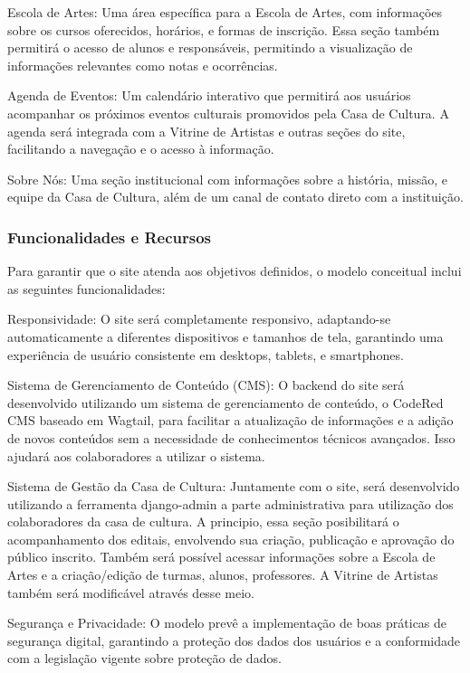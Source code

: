 Escola de Artes: Uma área específica para a Escola de Artes, com informações sobre os cursos oferecidos, horários, e formas de inscrição. Essa seção também permitirá o acesso de alunos e responsáveis, permitindo a visualização de informações relevantes como notas e ocorrências.

Agenda de Eventos: Um calendário interativo que permitirá aos usuários acompanhar os próximos eventos culturais promovidos pela Casa de Cultura. A agenda será integrada com a Vitrine de Artistas e outras seções do site, facilitando a navegação e o acesso à informação.

Sobre Nós: Uma seção institucional com informações sobre a história, missão, e equipe da Casa de Cultura, além de um canal de contato direto com a instituição.

\subsubsection{Funcionalidades e Recursos}

Para garantir que o site atenda aos objetivos definidos, o modelo conceitual inclui as seguintes funcionalidades:

Responsividade: O site será completamente responsivo, adaptando-se automaticamente a diferentes dispositivos e tamanhos de tela, garantindo uma experiência de usuário consistente em desktops, tablets, e smartphones.

Sistema de Gerenciamento de Conteúdo (CMS): O backend do site será desenvolvido utilizando um sistema de gerenciamento de conteúdo, o CodeRed CMS baseado em Wagtail, para facilitar a atualização de informações e a adição de novos conteúdos sem a necessidade de conhecimentos técnicos avançados. Isso ajudará aos colaboradores a utilizar o sistema.

Sistema de Gestão da Casa de Cultura: Juntamente com o site, será desenvolvido utilizando a ferramenta django-admin a parte administrativa para utilização dos colaboradores da casa de cultura. A principio, essa seção posibilitará o acompanhamento dos editais, envolvendo sua criação, publicação e aprovação do público inscrito. Também será possível acessar informações sobre a Escola de Artes e a criação/edição de turmas, alunos, professores. A Vitrine de Artistas também será modificável através desse meio.

Segurança e Privacidade: O modelo prevê a implementação de boas práticas de segurança digital, garantindo a proteção dos dados dos usuários e a conformidade com a legislação vigente sobre proteção de dados.

